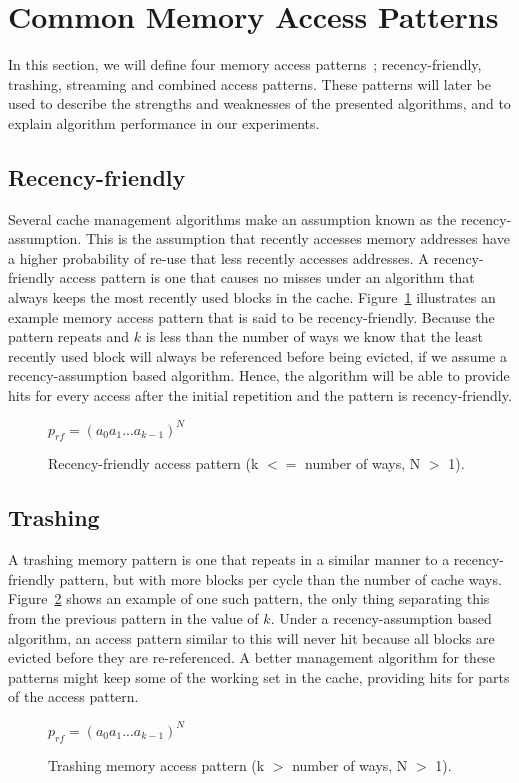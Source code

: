 \section{Common Memory Access Patterns}

In this section, we will define four memory access patterns~\cite{Jaleel2010}; recency-friendly, trashing, streaming and combined access patterns.
These patterns will later be used to describe the strengths and weaknesses of the presented algorithms, and to explain algorithm performance in our experiments.

\subsection{Recency-friendly}
Several cache management algorithms make an assumption known as the recency-assumption.
This is the assumption that recently accesses memory addresses have a higher probability of re-use that less recently accesses addresses.
A recency-friendly access pattern is one that causes no misses under an algorithm that always keeps the most recently used blocks in the cache.
Figure~\ref{fig:algorithms:rf_pattern} illustrates an example memory access pattern that is said to be recency-friendly.
Because the pattern repeats and $k$ is less than the number of ways we know that the least recently used block will always be referenced before being evicted, if we assume a recency-assumption based algorithm.
Hence, the algorithm will be able to provide hits for every access after the initial repetition and the pattern is recency-friendly.

\begin{figure}[ht]
\centering
$p_{rf} = (a_0 a_1 ... a_{k-1})^N$
\caption[Recency-friendly access pattern.]{Recency-friendly access pattern (k $<=$ number of ways, N $>$ 1).}
\label{fig:algorithms:rf_pattern}
\end{figure}

\subsection{Trashing}
A trashing memory pattern is one that repeats in a similar manner to a recency-friendly pattern, but with more blocks per cycle than the number of cache ways. 
Figure~\ref{fig:algorithms:tr_pattern} shows an example of one such pattern, the only thing separating this from the previous pattern in the value of $k$.
Under a recency-assumption based algorithm, an access pattern similar to this will never hit because all blocks are evicted before they are re-referenced.
A better management algorithm for these patterns might keep some of the working set in the cache, providing hits for parts of the access pattern.
\begin{figure}[ht]
\centering
$p_{rf} = (a_0 a_1 ... a_{k-1})^N$
\caption[Trashing memory access pattern.]{Trashing memory access pattern (k $>$ number of ways, N $>$ 1).}
\label{fig:algorithms:tr_pattern}
\end{figure}

